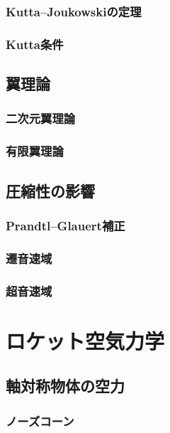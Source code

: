 \documentclass[uplatex,dvipdfmx,a4j,11pt]{jsreport}
\numberwithin{equation}{chapter}
\begin{document}
\subsection{Kutta--Joukowskiの定理}

\subsection{Kutta条件}

\section{翼理論}

\subsection{二次元翼理論}

\subsection{有限翼理論}

\section{圧縮性の影響}

\subsection{Prandtl--Glauert補正}

\subsection{遷音速域}

\subsection{超音速域}



\chapter{ロケット空気力学}

\section{軸対称物体の空力}

\subsection{ノーズコーン}
\end{document}
